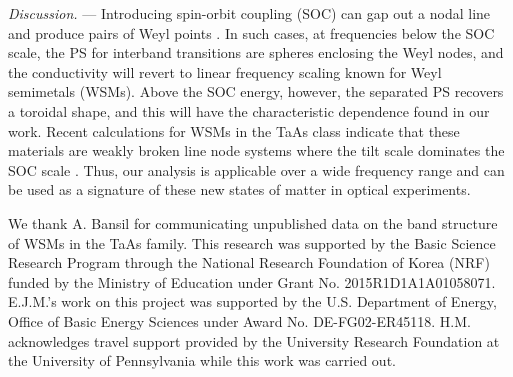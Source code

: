 \documentclass[aps,twocolumn,floatfix]{revtex4-1}
\begin{document}
{\em Discussion.} ---
Introducing spin-orbit coupling (SOC) can gap out a nodal line and produce pairs of Weyl points \cite{Fang2015}. In such cases, at frequencies below the SOC scale, the PS for interband transitions are spheres enclosing the Weyl nodes, and the  conductivity will revert to linear frequency scaling known for Weyl semimetals (WSMs). Above the SOC energy, however, the separated PS recovers a toroidal shape, and this will have the characteristic dependence found in our work. Recent calculations for WSMs in the TaAs class indicate that these materials are weakly broken line node systems where the tilt scale dominates the SOC scale \cite{Bansil}. Thus, our analysis is applicable over a wide frequency range and can be used as a signature of these new states of matter in optical experiments.




\acknowledgments
We thank A. Bansil for communicating unpublished data on the band structure of WSMs in the TaAs family. This research was supported by the Basic Science Research Program through the National Research Foundation of Korea (NRF) funded by the Ministry of Education under Grant No. 2015R1D1A1A01058071. E.J.M.'s work on this project was supported by the U.S. Department of Energy, Office of Basic Energy Sciences under Award No. DE-FG02-ER45118. H.M. acknowledges travel support provided by the University Research Foundation at the University of Pennsylvania while this work was carried out.
\end{document}
